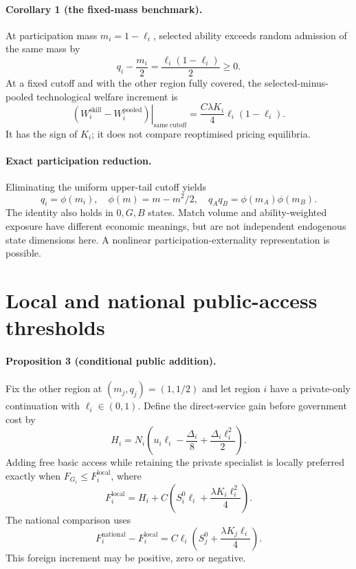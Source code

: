 \documentclass[11pt]{article}
\begin{document}
\paragraph{Corollary 1 (the fixed-mass benchmark).}
At participation mass $m_i=1-\ell_i$, selected ability exceeds random admission of the same mass by
\begin{equation}
 q_i-\frac{m_i}{2}=\frac{\ell_i(1-\ell_i)}2\geq0.
 \label{eq:C1}
\end{equation}
At a fixed cutoff and with the other region fully covered, the selected-minus-pooled technological welfare increment is
\begin{equation}
 \left.(W_i^{\mathrm{skill}}-W_i^{\mathrm{pooled}})\right|_{\mathrm{same\ cutoff}}
 =\frac{C\lambda K_i}{4}\ell_i(1-\ell_i).
 \label{eq:fixedmass-composition}
\end{equation}
It has the sign of $K_i$; it does not compare reoptimised pricing equilibria.

\paragraph{Exact participation reduction.}
Eliminating the uniform upper-tail cutoff yields
\begin{equation}
 q_i=\phi(m_i),\quad \phi(m)=m-m^2/2,\quad
 q_Aq_B=\phi(m_A)\phi(m_B).
 \label{eq:single-index-reduction}
\end{equation}
The identity also holds in $0,G,B$ states.
Match volume and ability-weighted exposure have different economic meanings, but are not independent endogenous state dimensions here.
A nonlinear participation-externality representation is possible.

\section{Local and national public-access thresholds}\label{sec:welfare}

\paragraph{Proposition 3 (conditional public addition).}
Fix the other region at $(m_j,q_j)=(1,1/2)$ and let region $i$ have a private-only continuation with $\ell_i\in(0,1)$.
Define the direct-service gain before government cost by
\begin{equation}
 H_i=N_i\left(u_i\ell_i-\frac{\Delta_i}{8}
                         +\frac{\Delta_i\ell_i^2}{2}\right).
 \label{eq:H}
\end{equation}
Adding free basic access while retaining the private specialist is locally preferred exactly when $F_{G_i}\leq F_i^{\mathrm{local}}$, where
\begin{equation}
 F_i^{\mathrm{local}}=H_i+C\left(S_i^0\ell_i+
                          \frac{\lambda K_i\ell_i^2}{4}\right).
 \label{eq:localcutoff}
\end{equation}
The national comparison uses
\begin{equation}
 F_i^{\mathrm{national}}-F_i^{\mathrm{local}}
 =C\ell_i\left(S_j^0+\frac{\lambda K_j\ell_i}{4}\right).
 \label{eq:wedge}
\end{equation}
This foreign increment may be positive, zero or negative.
\end{document}
